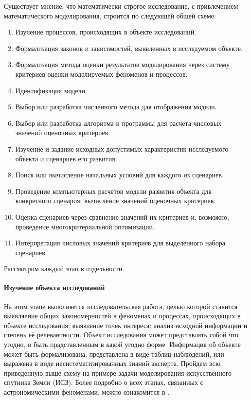 \documentclass[12pt, openany, twoside]{book} %
\begin{document}
Существует мнение, что математически строгое исследование, с привлечением математического моделирования, строится по следующей общей схеме:
\begin{enumerate}
\item Изучение процессов, происходящих в объекте исследований.
\item Формализация законов и зависимостей, выявленных в исследуемом объекте.
\item Формализация метода оценки результатов моделирования через систему критериев оценки моделируемых феноменов и процессов.
\item Идентификация модели.
\item Выбор или разработка численного метода для отображения модели.
\item Выбор или разработка алгоритма и программы для расчета числовых значений оценочных критериев.
\item Изучение и задание исходных допустимых характеристик исследуемого объекта и сценариев его развития. 
\item Поиск или вычисление начальных условий для каждого из сценариев.
\item Проведение компьютерных расчетов модели развития объекта для конкретного сценария; вычисление значений оценочных критериев.
\item Оценка сценариев через сравнение значений их критериев и, возможно, проведение многокритериальной оптимизации.
\item Интерпретация числовых значений критериев для выделенного набора сценариев.
\end{enumerate}

Рассмотрим каждый этап в отдельности.

\paragraph{Изучение объекта исследований} На этом этапе выполняется исследовательская работа, целью которой ставится выявляение общих закономерностей в феноменах и процессах, происходящих в объекте исследования; выявление точек интереса; анализ исходной информации и степень её релевантности. Объект исследования может представлять собой что угодно, и быть прадставленным в какой угодно форме. Информация об объекте может быть формализована, представлена в виде таблиц наблюдений, или выражена в виде несистематизированных знаний эксперта. Пройдем всю приведенную выше схему на примере задачи моделирования искусственного спутника Земли (ИСЗ). Более подробно о всех этапах, связанных с астрономическими феноменами, можно ознакомится в \cite{avanta}. 
\end{document}
